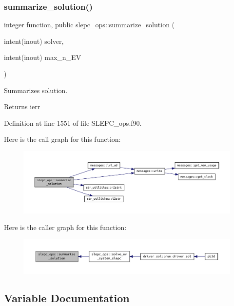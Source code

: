 \subsubsection{\texorpdfstring{summarize\+\_\+solution()}{summarize\_solution()}}
{\footnotesize\ttfamily integer function, public slepc\+\_\+ops\+::summarize\+\_\+solution (\begin{DoxyParamCaption}\item[{intent(inout)}]{solver,  }\item[{intent(inout)}]{max\+\_\+n\+\_\+\+EV }\end{DoxyParamCaption})}



Summarizes solution. 

\begin{DoxyReturn}{Returns}
ierr 
\end{DoxyReturn}


Definition at line 1551 of file S\+L\+E\+P\+C\+\_\+ops.\+f90.

Here is the call graph for this function\+:\nopagebreak
\begin{figure}[H]
\begin{center}
\leavevmode
\includegraphics[width=350pt]{namespaceslepc__ops_a03193dbc55e7061891d58e96a2bf1dd5_cgraph}
\end{center}
\end{figure}
Here is the caller graph for this function\+:\nopagebreak
\begin{figure}[H]
\begin{center}
\leavevmode
\includegraphics[width=350pt]{namespaceslepc__ops_a03193dbc55e7061891d58e96a2bf1dd5_icgraph}
\end{center}
\end{figure}


\subsection{Variable Documentation}
\mbox{\label{namespaceslepc__ops_ad57b5fd70608c1b97454963bdd1c4f5b}} 
